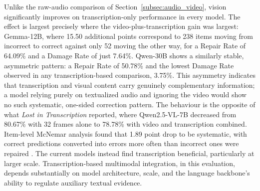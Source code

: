 Unlike the raw-audio comparison of Section~\ref{subsec:audio_video}, vision significantly improves on transcription-only performance in every model. The effect is largest precisely where the video-plus-transcription gain was largest: Gemma-12B, where 15.50 additional points correspond to 238 items moving from incorrect to correct against only 52 moving the other way, for a Repair Rate of 64.09\% and a Damage Rate of just 7.64\%. Qwen-30B shows a similarly stable, asymmetric pattern: a Repair Rate of 50.78\% and the lowest Damage Rate observed in any transcription-based comparison, 3.75\%. This asymmetry indicates that transcription and visual content carry genuinely complementary information; a model relying purely on textualized audio and ignoring the video would show no such systematic, one-sided correction pattern.
The behaviour is the opposite of what \textit{Lost in Transcription} reported, where Qwen2.5-VL-7B decreased from 80.67\% with 32 frames alone to 78.78\% with video and transcription combined. Item-level McNemar analysis found that 1.89 point drop to be systematic, with correct predictions converted into errors more often than incorrect ones were repaired \cite{deodati2026lost}. The current models instead find transcription beneficial, particularly at larger scale. Transcription-based multimodal integration, in this evaluation, depends substantially on model architecture, scale, and the language backbone's ability to regulate auxiliary textual evidence.

